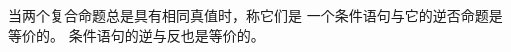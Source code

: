 {{{            当两个复合命题总是具有相同真值时，称它们是
            一个条件语句与它的逆否命题是等价的。
            条件语句的逆与反也是等价的。
        }



    }
}
